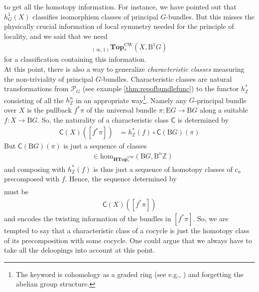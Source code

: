 to get all the homotopy information.
For instance, we have pointed out that $h_{G}^{1}(X)$ classifies isomorphism classes of principal $G$-bundles.
But this misses the physically crucial information of local symmetry needed for the principle of locality, and we said that we need
\begin{align*}
  {}_{(\infty,1)}\mathbf{Top}_{\ast}^{\textrm{CW}}
  \left(
    X,
    \mathrm{B}^{1}G
  \right)
\end{align*}
for a classification containing this information.
\\
At this point, there is also a way to generalize \textit{characteristic classes} measuring the non-triviality of principal $G$-bundles.
Characteristic classes are natural transformations from $\mathcal{P}_{G}$ (see example \ref{thm:repofbundlefunc}) to the functor $h_{\mathbb{Z}}^{\ast}$ consisting of all the $h_{\mathbb{Z}}^{n}$ in an appropriate way\footnote{The keyword is cohomology as a graded ring (see e.g., \cite{8b5861fc}) and forgetting the abelian group structure.}.
Namely any $G$-principal bundle over $X$ is the pullback $f^{\ast}\pi$ of the universal bundle $\pi \colon \mathrm{E}G \rightarrow \mathrm{B}G$ along a suitable $f \colon X \rightarrow \mathrm{B}G$.
So, the naturality of a characteristic class $\mathsf{C}$ is determined by
\begin{align*}
  \mathsf{C}(X)
  \left(
    [f^{\ast}\pi]
  \right)
  &=
  h_{\mathbb{Z}}^{\ast}(f)
  \circ
  \mathsf{C}(\mathrm{B}G)(\pi)
\end{align*}
But $\mathsf{C}(\mathrm{B}G)(\pi)$ is just a sequence of classes
\begin{align*}
  [c_{n}]
  &\in
  \mathrm{hom}_{\mathbf{HTop}_{\ast}^{\textrm{CW}}}
  \left(
    \mathrm{B}G,
    \mathrm{B}^{n}\mathbb{Z}
  \right)
\end{align*}
and composing with $h_{\mathbb{Z}}^{\ast}(f)$ is thus just a sequence of homotopy classes of $c_{n}$ precomposed with $f$.
Hence, the sequence determined by
\begin{align*}
  [c_{n} \circ f]
\end{align*}
must be
\begin{align*}
  \mathsf{C}(X)
  \left(
    [f^{\ast}\pi]
  \right)
\end{align*}
and encodes the twisting information of the bundles in $[f^{\ast}\pi]$.
So, we are tempted to say that a characteristic class of a cocycle is just the homotopy class of its precomposition with some cocycle.
One could argue that we always have to take all the deloopings into account at this point.
